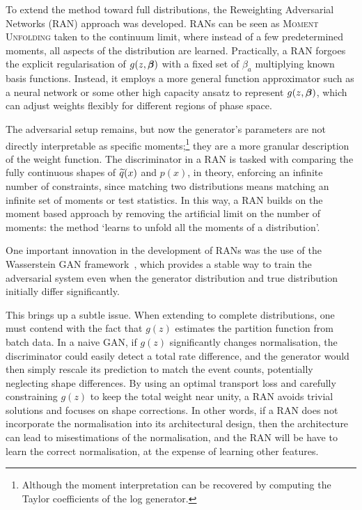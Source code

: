 {{        To extend the method toward full distributions, the Reweighting Adversarial Networks (RAN) approach was developed.
        RANs can be seen as \textsc{Moment Unfolding} taken to the continuum limit, where instead of a few predetermined moments, all aspects of the distribution are learned.
        Practically, a RAN forgoes the explicit regularisation of $g(z, \vb*\beta)$ with a fixed set of $\beta_a$ multiplying known basis functions.
        Instead, it employs a more general function approximator such as a neural network or some other high capacity ansatz to represent $g(z, \vb*\beta)$, which can adjust weights flexibly for different regions of phase space.
        
        The adversarial setup remains, but now the generator’s parameters are not directly interpretable as specific moments;\footnote{Although the moment interpretation can be recovered by computing the Taylor coefficients of the log generator.}
        they are a more granular description of the weight function.
        The discriminator in a RAN is tasked with comparing the fully continuous shapes of $\widetilde{q}(x)$ and $p(x)$, in theory, enforcing an infinite number of constraints, since matching two distributions means matching an infinite set of moments or test statistics.
        In this way, a RAN builds on the moment based approach by removing the artificial limit on the number of moments: the method `learns to unfold all the moments of a distribution'.

        One important innovation in the development of RANs was the use of the Wasserstein GAN framework~\cite{stephanovitch_optimal_2023}, which provides a stable way to train the adversarial system even when the generator distribution and true distribution initially differ significantly.

        This brings up a subtle issue.
        When extending to complete distributions, one must contend with the fact that $g(z)$ estimates the partition function from batch data.
        In a naive GAN, if $g(z)$ significantly changes normalisation, the discriminator could easily detect a total rate difference, and the generator would then simply rescale its prediction to match the event counts, potentially neglecting shape differences.
        By using an optimal transport loss and carefully constraining $g(z)$ to keep the total weight near unity, a RAN avoids trivial solutions and focuses on shape corrections.
        In other words, if a RAN does not incorporate the normalisation into its architectural design, then the architecture can lead to misestimations of the normalisation, and the RAN will be have to learn the correct normalisation, at the expense of learning other features. 
        
}}
